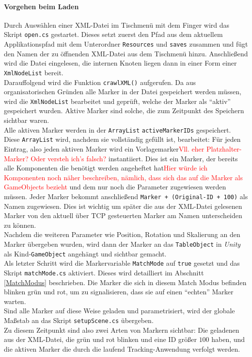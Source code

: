 \paragraph{Vorgehen beim Laden} Durch Auswählen einer XML-Datei im Tischmenü mit dem Finger wird das Skript \texttt{open.cs} gestartet. Dieses setzt zuerst den Pfad aus dem aktuellem Applikationspfad mit dem Unterordner \texttt{Resources} und \texttt{saves} zusammen und fügt den Namen der zu öffnenden XML-Datei aus dem Tischmenü hinzu. Anschließend wird die Datei eingelesen, die internen Knoten liegen dann in einer Form einer \texttt{XmlNodeList} bereit.\\ 
Darauffolgend wird die Funktion \texttt{crawlXML()} aufgerufen. Da aus organisatorischen Gründen alle Marker in der Datei gespeichert werden müssen, wird die \texttt{XmlNodeList} bearbeitet und geprüft, welche der Marker als "`aktiv"' gespeichert wurden. Aktive Marker sind solche, die zum Zeitpunkt des Speichern sichtbar waren.\\
Alle aktiven Marker werden in der \texttt{ArrayList} \texttt{activeMarkerIDs} gespeichert. Diese \texttt{ArrayList} wird, nachdem sie vollständig gefüllt ist, bearbeitet: Für jeden Eintrag, also jeden aktiven Marker wird ein Vorlagemarker\textcolor{red}{Vll. eher Platzhalter-Marker? Oder versteh ich's falsch?} instantiiert. Dies ist ein Marker, der bereits alle Komponenten die benötigt werden angeheftet hat\textcolor{red}{Hier würde ich Komponenten noch näher beschreiben, nämlich, dass sich das auf die Marker als GameObjects bezieht} und dem nur noch die Parameter zugewiesen werden müssen. Jeder Marker bekommt anschließend \texttt{Marker + (Original-ID + 100)} als Namen zugewiesen. Dies ist wichtig um später die aus der XML-Datei gelesenen Marker von den aktuell über TCP gesteuerten Marker am Namen unterscheiden zu können.\\
Nachdem die weiteren Parameter wie Position, Rotation und Skalierung an den Marker übergeben wurden, wird dann der Marker an das \texttt{TableObject} in \textit{Unity} als Kind-\texttt{GameObject} angehängt und sichtbar gemacht.\\
Als letzter Schritt wird die Markervariable \texttt{MatchMode} auf \texttt{true} gesetzt und das Skript \texttt{matchMode.cs} aktiviert. Dieses wird detailliert im Abschnitt \ref{MatchModus} beschrieben. Die Marker die sich in diesem Match Modus befinden blinken grün und rot, um zu signalisieren, dass sie auf einen "`echten"' Marker warten.\\
Sind alle Marker auf diese Weise geladen und parametrisiert, wird der globale Maßstab an das Skript \texttt{setupScene.cs} übergeben.\\
Zu diesem Zeitpunkt sind also zwei Arten von Markern sichtbar: Die geladenen aus der XML-Datei, die grün und rot blinken und eine ID größer $100$ haben, und die aktiven Marker die durch die laufend Tracking-Anwendung verfolgt werden.

